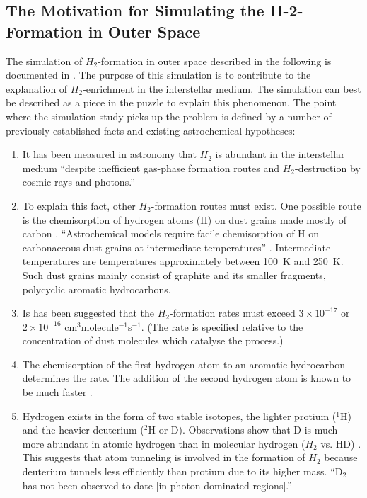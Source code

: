\documentclass[12pt, a4paper]{article}
\numberwithin{equation}{section}
\begin{document}
\subsection{The Motivation for Simulating the H-2-Formation in Outer
Space}

The simulation of $H_2$-formation in outer space described in the
following is documented in \citet{goumans-kaestner:2010}. The purpose
of this simulation is to contribute to the explanation of
$H_2$-enrichment in the interstellar medium. The simulation can best
be described as a piece in the puzzle to explain this phenomenon. The
point where the simulation study picks up the problem is defined by a
number of previously established facts and existing astrochemical
hypotheses:

\begin{enumerate}

\item It has been measured in astronomy that $H_2$ is abundant in the
  interstellar medium ``despite inefficient gas-phase formation routes
  and $H_2$-destruction by cosmic rays and photons.''
  \cite[p. 7350]{goumans-kaestner:2010}
  
\item To explain this fact, other $H_2$-formation routes must
  exist. One possible route is the chemisorption of hydrogen atoms (H)
  on dust grains made mostly of carbon
  \citep{Casaux-et-al:2008}. ``Astrochemical models require facile
  chemisorption of H on carbonaceous dust grains at intermediate
  temperatures'' \citep[p. 7350]{goumans-kaestner:2010}. Intermediate
  temperatures are temperatures approximately between 100~K and
  250~K. Such dust grains mainly consist of graphite and its smaller
  fragments, polycyclic aromatic hydrocarbons.

\item Is has been suggested that the $H_2$-formation rates must exceed
  $3\times 10^{-17}$ or $2\times 10^{-16}$
  cm$^3$molecule$^{-1}$s$^{-1}$. \citep{habart-et-al:2004} (The rate
  is specified relative to the concentration of dust molecules which
  catalyse the process.)

\item The chemisorption of the first hydrogen atom to an aromatic
  hydrocarbon determines the rate. The addition of the second hydrogen
  atom is known to be much faster \citep{Hornekaer-et-al:2006}.
  
\item Hydrogen exists in the form of two stable isotopes, the lighter
  protium ($^1$H) and the heavier deuterium ($^2$H or D). Observations
  show that D is much more abundant in atomic hydrogen than in
  molecular hydrogen ($H_2$ vs. HD) \citep{Casaux-et-al:2008}. This
  suggests that atom tunneling is involved in the formation of $H_2$
  because deuterium tunnels less efficiently than protium due to its
  higher mass. ``D$_2$ has not been observed to date [in photon
  dominated regions].'' \cite[p. 496]{Casaux-et-al:2008}
 
\end{enumerate}
\end{document}
